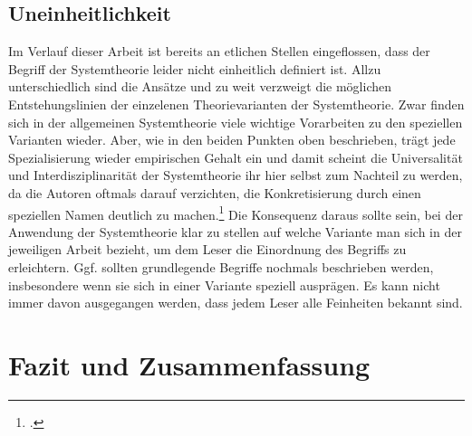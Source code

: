 \documentclass[a4paper,12pt]{article}
\begin{document}
\subsection{Uneinheitlichkeit}
Im Verlauf dieser Arbeit ist bereits an etlichen Stellen eingeflossen, dass der Begriff der Systemtheorie leider nicht einheitlich definiert ist. Allzu unterschiedlich sind die Ansätze und zu weit verzweigt die möglichen Entstehungslinien der einzelenen Theorievarianten der Systemtheorie. Zwar finden sich in der allgemeinen Systemtheorie viele wichtige Vorarbeiten zu den speziellen Varianten wieder. Aber, wie in den beiden Punkten oben beschrieben, trägt jede Spezialisierung wieder empirischen Gehalt ein und damit scheint die Universalität und Interdisziplinarität der Systemtheorie ihr hier selbst zum Nachteil zu werden, da die Autoren oftmals darauf verzichten, die Konkretisierung durch einen speziellen Namen deutlich zu machen.\footcite[S. 12]{Luhmann1999} Die Konsequenz daraus sollte sein, bei der Anwendung der Systemtheorie klar zu stellen auf welche Variante man sich in der jeweiligen Arbeit bezieht, um dem Leser die Einordnung des Begriffs zu erleichtern. Ggf. sollten grundlegende Begriffe nochmals beschrieben werden, insbesondere wenn sie sich in einer Variante speziell ausprägen. Es kann nicht immer davon ausgegangen werden, dass jedem Leser alle Feinheiten bekannt sind.


\section{Fazit und Zusammenfassung}
\end{document}
